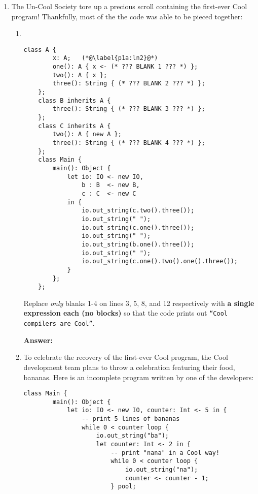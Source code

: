 \documentclass[11pt]{article}
\begin{document}
\begin{enumerate}
\item The Un-Cool Society tore up a precious scroll containing the first-ever Cool program!
Thankfully, most of the the code was able to be pieced together:
\begin{enumerate}
    \item ~
    \begin{lstlisting}[gobble=4, emph={x,io,a,b,c}, basicstyle=\small]
    class A {
        x: A;   (*@\label{p1a:ln2}@*)
        one(): A { x <- (* ??? BLANK 1 ??? *) };
        two(): A { x };
        three(): String { (* ??? BLANK 2 ??? *) };
    };
    class B inherits A {
        three(): String { (* ??? BLANK 3 ??? *) };
    };
    class C inherits A {
        two(): A { new A };
        three(): String { (* ??? BLANK 4 ??? *) };
    };
    class Main {
        main(): Object {
            let io: IO <- new IO,
                b : B  <- new B,
                c : C  <- new C
            in {
                io.out_string(c.two().three());
                io.out_string(" ");
                io.out_string(c.one().three());
                io.out_string(" ");
                io.out_string(b.one().three());
                io.out_string(" ");
                io.out_string(c.one().two().one().three());
            }
        };
    };
    \end{lstlisting}

    \newpage

    Replace \textit{only} blanks 1-4 on lines 3, 5, 8, and 12 respectively with
    \textbf{a single expression each (no blocks)} so that the code
    prints out \texttt{``Cool compilers are Cool''}.

    \bigskip

    \textbf{Answer:}

    \newpage

    \item To celebrate the recovery of the first-ever Cool program, the Cool development team
    plans to throw a celebration featuring their food, bananas. Here is an incomplete program
    written by one of the developers:
    \begin{lstlisting}[gobble=4, emph={io,x}, basicstyle=\small]
    class Main {
        main(): Object {
            let io: IO <- new IO, counter: Int <- 5 in {
                -- print 5 lines of bananas
                while 0 < counter loop {
                    io.out_string("ba");
                    let counter: Int <- 2 in {
                        -- print "nana" in a Cool way!
                        while 0 < counter loop {
                            io.out_string("na");
                            counter <- counter - 1;
                        } pool;


\end{lstlisting}
\end{enumerate}
\end{enumerate}
\end{document}
